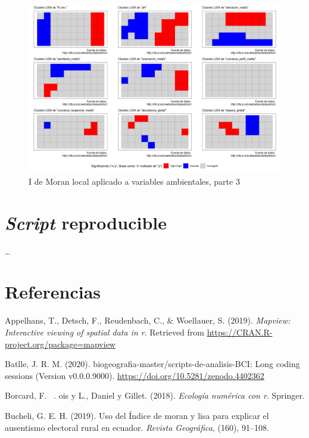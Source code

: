 \documentclass[11pt,]{article}
\begin{document}
\begin{figure}
\centering
\includegraphics{ee_files/yodemoranlocal-3.png}
\caption{I de Moran local aplicado a variables ambientales, parte 3
\label{fig:imoranlocal3}}
\end{figure}

\section{\texorpdfstring{\emph{Script}
reproducible}{Script reproducible}}\label{script-reproducible}

\ldots

\section*{Referencias}\label{referencias}

\hypertarget{refs}{}
\hypertarget{ref-mapview}{}
Appelhans, T., Detsch, F., Reudenbach, C., \& Woellauer, S. (2019).
\emph{Mapview: Interactive viewing of spatial data in r}. Retrieved from
\url{https://CRAN.R-project.org/package=mapview}

\hypertarget{ref-jose_ramon_martinez_batlle_2020_4402362}{}
Batlle, J. R. M. (2020). biogeografia-master/scripts-de-analisis-BCI:
Long coding sessions (Version v0.0.0.9000).
\url{https://doi.org/10.5281/zenodo.4402362}

\hypertarget{ref-borcard2018numerical}{}
Borcard, F. ~. ois y L., Daniel y Gillet. (2018). \emph{Ecología
numérica con r}. Springer.

\hypertarget{ref-bucheli2019uso}{}
Bucheli, G. E. H. (2019). Uso del Índice de moran y lisa para explicar
el ausentismo electoral rural en ecuador. \emph{Revista Geográfica},
(160), 91--108.
\end{document}
